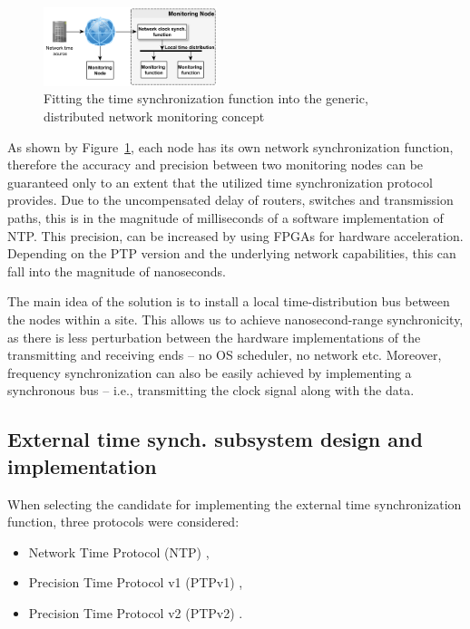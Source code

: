 \documentclass[journal]{IEEEtran}
\begin{document}
\begin{figure}[!htb]
    \centering
    \includegraphics[width=0.45\textwidth]{figures_raw/concept.png}
    \caption{Fitting the time synchronization function into the generic, distributed network monitoring concept}
    \label{fig:concept}
\end{figure}

As shown by Figure~\ref{fig:concept}, each node has its own network synchronization function, therefore the accuracy and
precision between two monitoring nodes can be guaranteed only to an extent that the utilized time synchronization
protocol provides. Due to the uncompensated delay of routers, switches and transmission paths, this is in the magnitude of milliseconds of a software implementation of NTP. This precision, can be increased by using FPGAs for hardware acceleration. Depending on the PTP version and the underlying network capabilities, this can fall into the magnitude of nanoseconds.

The main idea of the solution is to install a local time-distribution bus between the nodes within a site. This allows us to achieve nanosecond-range synchronicity, as there is
less perturbation between the hardware implementations of the transmitting and receiving ends -- no OS scheduler, no network etc. Moreover, frequency synchronization can also be easily achieved by implementing a synchronous bus -- i.e., transmitting
the
clock signal along with the data.

\subsection{External time synch. subsystem design and implementation}\label{sec:External-Impl}

When selecting the candidate for implementing the external time synchronization function, three protocols were considered:
\begin{itemize}
    \item Network Time Protocol (NTP) \cite{NTP_book},
    \item Precision Time Protocol v1 (PTPv1) \cite{PTPv1},
    \item Precision Time Protocol v2 (PTPv2) \cite{PTP_standard}.
\end{itemize}
\end{document}
